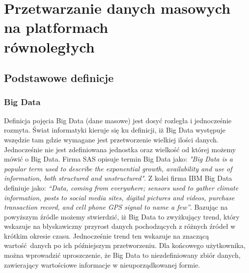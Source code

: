 \chapter{Przetwarzanie danych masowych na platformach\\równoległych} \label{chap.big-data-processing}

\section{Podstawowe definicje}
\subsection{Big Data}
Definicja pojęcia Big Data (dane masowe) jest dosyć rozległa i jednocześnie rozmyta. Świat informatyki kieruje się ku definicji, iż Big Data występuje wszędzie tam gdzie wymagane jest przetworzenie wielkiej ilości danych. Jednocześnie nie jest zdefiniowana jednostka oraz wielkość od której możemy mówić o Big Data. Firma SAS opisuje termin Big Data jako: \newline \textit{"Big Data is 
a  popular  term  used  to  describe  the  exponential  growth,  
availability  and  use  of  information,  both  structured  and  
unstructured"}. \newline Z kolei firma IBM Big Data definiuje jako: \textit{“Data, 
coming  from  everywhere;  sensors  used  to  gather  climate  
information,  posts  to  social  media  sites,  digital  pictures  
and  videos,  purchase  transaction  record,  and  cell  phone  
GPS signal to name a few”}\cite{big_data_concept}. Bazując na powyższym źródle możemy stwierdzić, iż Big Data to zwyżkujący trend, który wskazuje na błyskawiczny przyrost danych pochodzących z różnych źródeł w krótkim okresie czasu. Jednocześnie trend ten wskazuje na znaczącą wartość danych po ich późniejszym przetworzeniu. Dla końcowego użytkownika, można wprowadzić uproszczenie, że Big Data to niezdefiniowany zbiór danych, zawierający wartościowe informacje w nieuporządkowanej formie.
